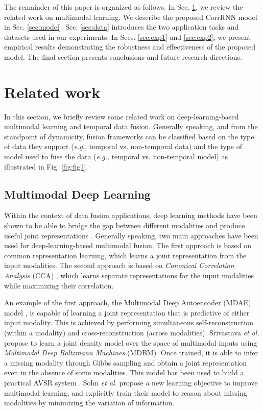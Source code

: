 \documentclass[10pt,twocolumn,letterpaper]{article}
\begin{document}
The remainder of this paper is organized as follows. In Sec. \ref{sec:related}, we review the related work on multimodal learning. We describe the proposed CorrRNN model in Sec. \ref{sec:model}. Sec. \ref{sec:data} introduces the two application tasks and datasets used in our experiments. In Secs. \ref{sec:exp1} and \ref{sec:exp2}, we present empirical results demonstrating the robustness and effectiveness of the proposed model. The final section presents conclusions and future research directions.

\section{Related work}
\label{sec:related}
In this section, we briefly review some related work on deep-learning-based multimodal learning and temporal data fusion. Generally speaking, and from the standpoint of dynamicity, fusion frameworks can be classified based on the type of data they support (\textit{e.g.}, temporal vs. non-temporal data) and the type of model used to fuse the data (\textit{e.g.}, temporal vs. non-temporal model) as illustrated in Fig. \ref{fig:fig1}.

\subsection{Multimodal Deep Learning}
Within the context of data fusion applications, deep learning methods have been shown to be able to bridge the gap between different modalities and produce useful joint representations \cite{ngiam2011multimodal,srivastava2012multimodal}. Generally speaking, two main approaches have been used for deep-learning-based multimodal fusion. The first approach is based on common representation learning, which learns a joint representation from the input modalities. The second approach is based on \textit{Canonical Correlation Analysis} (CCA) \cite{hardoon2004canonical}, which learns separate representations for the input modalities while maximizing their correlation.

An example of the first approach, the Multimodal Deep Autoencoder (MDAE) model \cite{ngiam2011multimodal}, is capable of learning a joint representation that is predictive of either input modality. This is achieved by performing simultaneous self-reconstruction (within a modality) and cross-reconstruction (across modalities). Srivastava \textit{et al.} \cite{srivastava2012multimodal} propose to learn a joint density model over the space of multimodal inputs using \textit{Multimodal Deep Boltzmann Machines} (MDBM). Once trained, it is able to infer a missing modality through Gibbs sampling and obtain a joint representation even in the absence of some modalities. This model has been used to build a practical AVSR system \cite{sui2015listening}. Sohn \textit{et al.} \cite{sohn2014improved} propose a new learning objective to improve multimodal learning, and explicitly train their model to reason about missing modalities by minimizing the variation of information.
\end{document}
